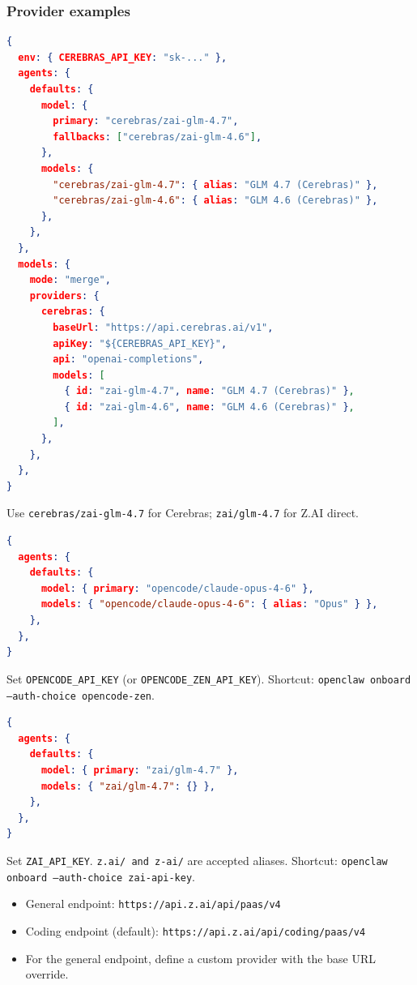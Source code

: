 \subsubsection{Provider examples}



\begin{lstlisting}[language=json]
{
  env: { CEREBRAS_API_KEY: "sk-..." },
  agents: {
    defaults: {
      model: {
        primary: "cerebras/zai-glm-4.7",
        fallbacks: ["cerebras/zai-glm-4.6"],
      },
      models: {
        "cerebras/zai-glm-4.7": { alias: "GLM 4.7 (Cerebras)" },
        "cerebras/zai-glm-4.6": { alias: "GLM 4.6 (Cerebras)" },
      },
    },
  },
  models: {
    mode: "merge",
    providers: {
      cerebras: {
        baseUrl: "https://api.cerebras.ai/v1",
        apiKey: "${CEREBRAS_API_KEY}",
        api: "openai-completions",
        models: [
          { id: "zai-glm-4.7", name: "GLM 4.7 (Cerebras)" },
          { id: "zai-glm-4.6", name: "GLM 4.6 (Cerebras)" },
        ],
      },
    },
  },
}
\end{lstlisting}


Use \texttt{cerebras/zai-glm-4.7} for Cerebras; \texttt{zai/glm-4.7} for Z.AI direct.



\begin{lstlisting}[language=json]
{
  agents: {
    defaults: {
      model: { primary: "opencode/claude-opus-4-6" },
      models: { "opencode/claude-opus-4-6": { alias: "Opus" } },
    },
  },
}
\end{lstlisting}


Set \texttt{OPENCODE\_API\_KEY} (or \texttt{OPENCODE\_ZEN\_API\_KEY}). Shortcut: \texttt{openclaw onboard --auth-choice opencode-zen}.



\begin{lstlisting}[language=json]
{
  agents: {
    defaults: {
      model: { primary: "zai/glm-4.7" },
      models: { "zai/glm-4.7": {} },
    },
  },
}
\end{lstlisting}


Set \texttt{ZAI\_API\_KEY}. \texttt{z.ai/\textit{} and \texttt{z-ai/}} are accepted aliases. Shortcut: \texttt{openclaw onboard --auth-choice zai-api-key}.

\begin{itemize}
  \item General endpoint: \texttt{https://api.z.ai/api/paas/v4}
  \item Coding endpoint (default): \texttt{https://api.z.ai/api/coding/paas/v4}
  \item For the general endpoint, define a custom provider with the base URL override.
\end{itemize}




